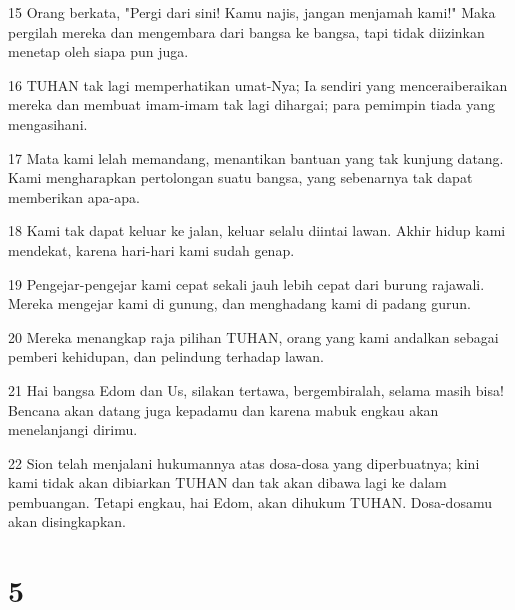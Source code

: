 \par 15 Orang berkata, "Pergi dari sini! Kamu najis, jangan menjamah kami!" Maka pergilah mereka dan mengembara dari bangsa ke bangsa, tapi tidak diizinkan menetap oleh siapa pun juga.
\par 16 TUHAN tak lagi memperhatikan umat-Nya; Ia sendiri yang menceraiberaikan mereka dan membuat imam-imam tak lagi dihargai; para pemimpin tiada yang mengasihani.
\par 17 Mata kami lelah memandang, menantikan bantuan yang tak kunjung datang. Kami mengharapkan pertolongan suatu bangsa, yang sebenarnya tak dapat memberikan apa-apa.
\par 18 Kami tak dapat keluar ke jalan, keluar selalu diintai lawan. Akhir hidup kami mendekat, karena hari-hari kami sudah genap.
\par 19 Pengejar-pengejar kami cepat sekali jauh lebih cepat dari burung rajawali. Mereka mengejar kami di gunung, dan menghadang kami di padang gurun.
\par 20 Mereka menangkap raja pilihan TUHAN, orang yang kami andalkan sebagai pemberi kehidupan, dan pelindung terhadap lawan.
\par 21 Hai bangsa Edom dan Us, silakan tertawa, bergembiralah, selama masih bisa! Bencana akan datang juga kepadamu dan karena mabuk engkau akan menelanjangi dirimu.
\par 22 Sion telah menjalani hukumannya atas dosa-dosa yang diperbuatnya; kini kami tidak akan dibiarkan TUHAN dan tak akan dibawa lagi ke dalam pembuangan. Tetapi engkau, hai Edom, akan dihukum TUHAN. Dosa-dosamu akan disingkapkan.

\chapter{5}


